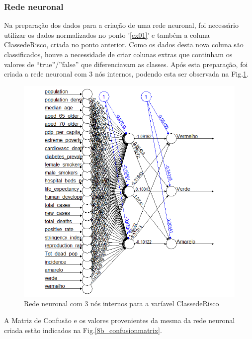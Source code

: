 \documentclass[conference]{IEEEtran}
\begin{document}
\subsubsection{Rede neuronal}
Na preparação dos dados para a criação de uma rede neuronal, foi necessário utilizar os dados normalizados no ponto '\ref{ex01}' e também a coluna ClassedeRisco, criada no ponto anterior. Como os dados desta nova coluna são classificados, houve a necessidade de criar colunas extras que continham os valores de “true”/”false” que diferenciavam as classes.
Após esta preparação, foi criada a rede neuronal com 3 nós internos, podendo esta ser observada na Fig.\ref{8b_neural}.
\begin{figure}[htbp]
\centerline{\includegraphics[width=0.95\columnwidth]{images/08_3.png}}
\caption{Rede neuronal com 3 nós internos para a varíavel ClassedeRisco}
\label{8b_neural}
\end{figure}
A Matriz de Confusão e os valores provenientes da mesma da rede neuronal criada estão indicados na Fig.\ref{8b_confusionmatrix}.
\end{document}
